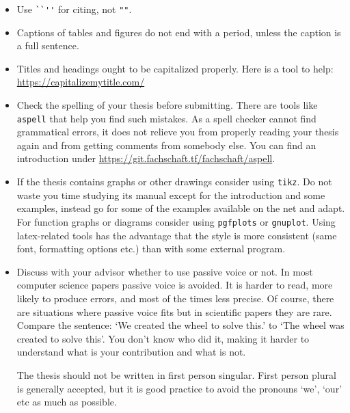 \begin{itemize}
        \item Use \verb|``''| for citing, not \verb|""|.
        \item Captions of tables and figures do not end with a period, unless the caption is a full sentence.
        \item Titles and headings ought to be capitalized properly. Here is a tool to help: \url{https://capitalizemytitle.com/}

        \item Check the spelling of your thesis before submitting. There are tools like \texttt{aspell} that help you find such mistakes. 
        As a spell checker cannot find grammatical errors, it does not relieve you from properly reading your thesis again and from getting comments from somebody else.
        You can find an introduction under \url{https://git.fachschaft.tf/fachschaft/aspell}.

      \item If the thesis contains graphs or other drawings consider
        using \texttt{tikz}. Do not waste you time studying its manual
        except for the introduction and some examples, instead go for
        some of the examples available on the net and adapt. For
        function graphs or diagrams consider using \texttt{pgfplots}
        or \texttt{gnuplot}.  Using latex-related tools has the
        advantage that the style is more consistent (same font,
        formatting options etc.) than with some external program.

      \item Discuss with your advisor whether to use passive voice or
        not. In most computer science papers passive voice is
        avoided. It is harder to read, more likely to produce errors,
        and most of the times less precise. Of course, there are
        situations where passive voice fits but in scientific papers
        they are rare. Compare the sentence: `We created the wheel to
        solve this.' to `The wheel was created to solve this'.  You
        don't know who did it, making it harder to understand what is
        your contribution and what is not.

        The thesis should not be written in first person singular. First person plural is generally accepted, but it is good practice to avoid the pronouns `we', `our' etc as much as possible.

    \end{itemize}